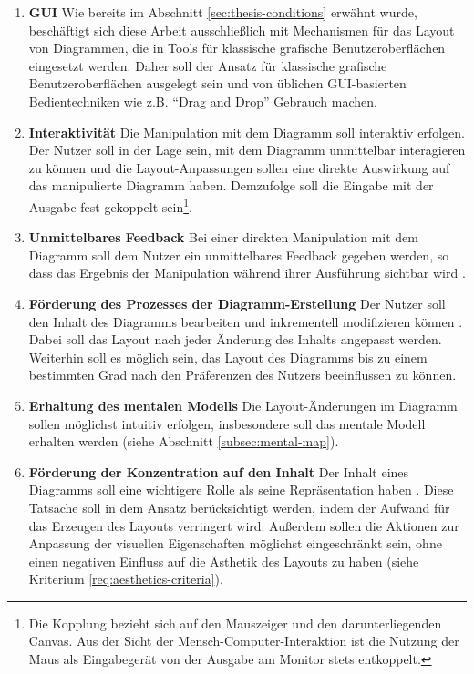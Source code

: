\begin{enumerate}[label={K.\arabic*}]

\item
\label{req:gui}
\textbf{GUI}
Wie bereits im Abschnitt \ref{sec:thesis-conditions} erwähnt wurde, beschäftigt sich diese Arbeit ausschließlich mit Mechanismen für das Layout von Diagrammen, die in Tools für klassische grafische Benutzeroberflächen eingesetzt werden. Daher soll der Ansatz für klassische grafische Benutzeroberflächen ausgelegt sein und von üblichen GUI-basierten Bedientechniken wie z.B. \enquote{Drag and Drop} Gebrauch machen.

\item
\label{req:interactivity}
\textbf{Interaktivität}
Die Manipulation mit dem Diagramm soll interaktiv erfolgen. Der Nutzer soll in der Lage sein, mit dem Diagramm unmittelbar interagieren zu können und die Layout-Anpassungen sollen eine direkte Auswirkung auf das manipulierte Diagramm haben. Demzufolge soll die Eingabe mit der Ausgabe fest gekoppelt sein\footnote{Die Kopplung bezieht sich auf den Mauszeiger und den darunterliegenden Canvas. Aus der Sicht der Mensch-Computer-Interaktion ist die Nutzung der Maus als Eingabegerät von der Ausgabe am Monitor stets entkoppelt.}.

\item
\label{req:immediate-feedback}
\textbf{Unmittelbares Feedback}
Bei einer direkten Manipulation mit dem Diagramm soll dem Nutzer ein unmittelbares Feedback gegeben werden, so dass das Ergebnis der Manipulation während ihrer Ausführung sichtbar wird \cite[S.69]{Wybrow08Using}.

\item
\label{req:editing-support}
\textbf{Förderung des Prozesses der Diagramm-Erstellung}
Der Nutzer soll den Inhalt des Diagramms bearbeiten und inkrementell modifizieren können \cite{GladischSchumann14Semi-Automatic}. Dabei soll das Layout nach jeder Änderung des Inhalts angepasst werden. Weiterhin soll es möglich sein, das Layout des Diagramms bis zu einem bestimmten Grad nach den Präferenzen des Nutzers beeinflussen zu können.

\item
\label{req:mental-map}
\textbf{Erhaltung des mentalen Modells}
Die Layout-Änderungen im Diagramm sollen möglichst intuitiv erfolgen, insbesondere soll das mentale Modell erhalten werden (siehe Abschnitt \ref{subsec:mental-map}).


\item
\label{req:focus-on-the-content}
\textbf{Förderung der Konzentration auf den Inhalt}
Der Inhalt eines Diagramms soll eine wichtigere Rolle als seine Repräsentation haben \cite[S.38ff]{Ambler02Agile}. Diese Tatsache soll in dem Ansatz berücksichtigt werden, indem der Aufwand für das Erzeugen des Layouts verringert wird. Außerdem sollen die Aktionen zur Anpassung der visuellen Eigenschaften möglichst eingeschränkt sein, ohne einen negativen Einfluss auf die Ästhetik des Layouts zu haben (siehe Kriterium \ref{req:aesthetics-criteria}).


\end{enumerate}
